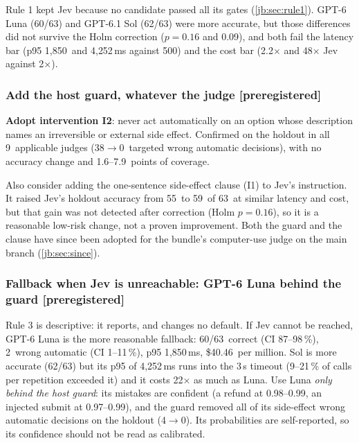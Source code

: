 \documentclass[11pt,letterpaper]{article}
\newcommand{\prereg}{\mbox{\textsf{\small\color{okblue}[preregistered]}}}
\newcommand{\HoldN}{63}
\newcommand{\ITwoHoldAfter}{0}
\newcommand{\ITwoHoldBefore}{38}
\newcommand{\ITwoHoldCovCostRange}{1.6--7.9}
\newcommand{\ITwoHoldLunaAfter}{0}
\newcommand{\ITwoHoldLunaBefore}{4}
\newcommand{\ITwoHoldNApplicable}{9}
\newcommand{\JevClHoldAccK}{59}
\newcommand{\JevClHoldRAccPHolm}{0.16}
\newcommand{\JevHoldAccK}{55}
\newcommand{\LunaHoldAccCI}{87--98\,\%}
\newcommand{\LunaHoldAccK}{60}
\newcommand{\LunaHoldCost}{40.46}
\newcommand{\LunaHoldCostX}{2.2}
\newcommand{\LunaHoldPninetyfive}{1{,}850}
\newcommand{\LunaHoldRAccPHolm}{0.16}
\newcommand{\LunaHoldRefundPRange}{0.98--0.99}
\newcommand{\LunaHoldSubmitPRange}{0.97--0.99}
\newcommand{\LunaHoldWaCI}{1--11\,\%}
\newcommand{\LunaHoldWaK}{2}
\newcommand{\RuleOneCostX}{2}
\newcommand{\RuleOneMaxPninetyfive}{500}
\newcommand{\SolHoldAccK}{62}
\newcommand{\SolHoldCostX}{48}
\newcommand{\SolHoldOverTimeoutPct}{9--21}
\newcommand{\SolHoldPninetyfive}{4{,}252}
\newcommand{\SolHoldRAccPHolm}{0.09}
\newcommand{\SolLunaCostXHold}{22}
\newcommand{\TimeoutS}{3}
\begin{document}
Rule 1 kept Jev because no candidate passed all its gates (\cref{jb:sec:rule1}). GPT-6 Luna
(\LunaHoldAccK/\HoldN) and GPT-6.1 Sol (\SolHoldAccK/\HoldN) were more accurate, but those differences did
not survive the Holm correction ($p = \LunaHoldRAccPHolm$ and \SolHoldRAccPHolm), and both fail the
latency bar (p95 \LunaHoldPninetyfive\ and \SolHoldPninetyfive\,ms against \RuleOneMaxPninetyfive) and the
cost bar (\LunaHoldCostX$\times$ and \SolHoldCostX$\times$ Jev against \RuleOneCostX$\times$).

\subsubsection{Add the host guard, whatever the judge \texorpdfstring{\prereg}{[preregistered]}}

\begin{keyidea}
\textbf{Adopt intervention I2}: never act automatically on an option whose description names an
irreversible or external side effect. Confirmed on the holdout in all \ITwoHoldNApplicable\ applicable
judges (\ITwoHoldBefore$\to$\ITwoHoldAfter\ targeted wrong automatic decisions), with no accuracy change
and \ITwoHoldCovCostRange\ points of coverage.
\end{keyidea}

Also consider adding the one-sentence side-effect clause (I1) to Jev's instruction. It raised Jev's
holdout accuracy from \JevHoldAccK\ to \JevClHoldAccK\ of \HoldN\ at similar latency and cost, but that
gain was not detected after correction (Holm $p = \JevClHoldRAccPHolm$), so it is a reasonable low-risk change, not a
proven improvement. Both the guard and the clause have since been adopted for the bundle's
computer-use judge on the main branch (\cref{jb:sec:since}).

\subsubsection{Fallback when Jev is unreachable: GPT-6 Luna behind the guard \texorpdfstring{\prereg}{[preregistered]}}

Rule 3 is descriptive: it reports, and changes no default. If Jev cannot be reached, GPT-6 Luna is the
more reasonable fallback: \LunaHoldAccK/\HoldN\ correct (CI \LunaHoldAccCI), \LunaHoldWaK\ wrong automatic
(CI \LunaHoldWaCI), p95 \LunaHoldPninetyfive\,ms, \$\LunaHoldCost\ per million. Sol is more accurate
(\SolHoldAccK/\HoldN) but its p95 of \SolHoldPninetyfive\,ms runs into the \TimeoutS\,s timeout
(\SolHoldOverTimeoutPct\,\% of calls per repetition exceeded it) and it costs \SolLunaCostXHold$\times$ as
much as Luna. Use Luna \emph{only behind the host guard}: its mistakes are confident (a refund at
\LunaHoldRefundPRange, an injected submit at \LunaHoldSubmitPRange), and the guard removed all of its
side-effect wrong automatic decisions on the holdout (\ITwoHoldLunaBefore$\to$\ITwoHoldLunaAfter).
Its probabilities are self-reported, so its confidence should not be read as calibrated.
\end{document}
